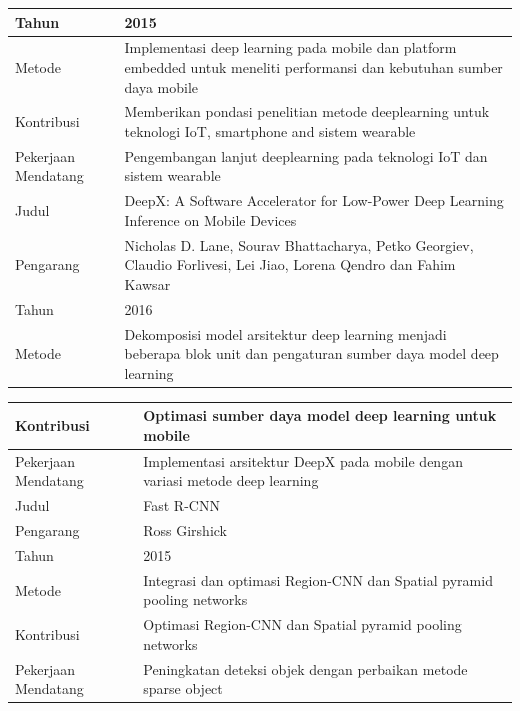 \begin{table}
\begin{tabular}{ |m{2cm}|m{7cm}|m{1cm}|m{1cm}| }
		\hline
		Tahun & \multicolumn{3}{|m{13cm}|}{2015} \\ 
		\hline
		Metode & \multicolumn{3}{|m{13cm}|}{Implementasi deep learning pada mobile dan platform embedded untuk meneliti performansi dan kebutuhan sumber daya mobile}\\
		\hline
		Kontribusi  & \multicolumn{3}{|m{13cm}|}{Memberikan pondasi penelitian metode deeplearning untuk teknologi IoT, smartphone and sistem wearable}\\ 
		\hline
		Pekerjaan Mendatang  & \multicolumn{3}{|m{13cm}|}{Pengembangan lanjut deeplearning pada teknologi IoT dan sistem wearable} \\
		\hline\hline
		Judul & \multicolumn{3}{|m{13cm}|}{DeepX: A Software Accelerator for Low-Power Deep Learning Inference on Mobile Devices} \\
		\hline
		Pengarang & \multicolumn{3}{|m{13cm}|}{Nicholas D. Lane, Sourav Bhattacharya, Petko Georgiev, Claudio Forlivesi, Lei Jiao, Lorena Qendro dan Fahim Kawsar} \\ 
		\hline
		Tahun & \multicolumn{3}{|m{13cm}|}{2016} \\ 
		\hline
		Metode & \multicolumn{3}{|m{13cm}|}{Dekomposisi model arsitektur deep learning menjadi beberapa blok unit dan pengaturan sumber daya model deep learning}\\
		\hline
	\end{tabular}
\end{table}

\begin{table}
	\clearpage
	\centering
	\begin{tabular}{ |m{2cm}|m{7cm}|m{1cm}|m{1cm}| } 	
		\hline
		Kontribusi  & \multicolumn{3}{|m{13cm}|}{Optimasi sumber daya model deep learning untuk mobile}\\ 
		\hline
		Pekerjaan Mendatang  & \multicolumn{3}{|m{13cm}|}{Implementasi arsitektur DeepX pada mobile dengan variasi metode deep learning} \\
		\hline\hline	
		Judul & \multicolumn{3}{|m{13cm}|}{Fast R-CNN} \\
		\hline
		Pengarang & \multicolumn{3}{|m{13cm}|}{Ross Girshick} \\ 
		\hline
		Tahun & \multicolumn{3}{|m{13cm}|}{2015} \\ 
		\hline
		Metode & \multicolumn{3}{|m{13cm}|}{Integrasi dan optimasi Region-CNN dan Spatial pyramid pooling networks}\\
		\hline
		Kontribusi  & \multicolumn{3}{|m{13cm}|}{Optimasi Region-CNN dan Spatial pyramid pooling networks}\\ 
		\hline
		Pekerjaan Mendatang  & \multicolumn{3}{|m{13cm}|}{Peningkatan deteksi objek dengan perbaikan metode sparse object} \\
		\hline
	\end{tabular}
\end{table}
